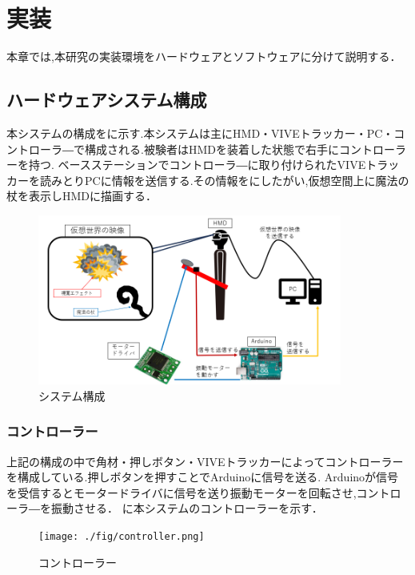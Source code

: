 \chapter{実装}
本章では,本研究の実装環境をハードウェアとソフトウェアに分けて説明する．

\section{ハードウェアシステム構成}
本システムの構成をに示す.本システムは主にHMD・VIVEトラッカー・PC・コントローラ―で構成される.被験者はHMDを装着した状態で右手にコントローラーを持つ.
ベースステーションでコントローラ―に取り付けられたVIVEトラッカーを読みとりPCに情報を送信する.その情報をにしたがい,仮想空間上に魔法の杖を表示しHMDに描画する．

\begin{figure}[h]
\centering
\includegraphics[clip,width=10cm]{fig/systemhard.png}
\caption{システム構成}\label{sys}
\end{figure}

\newpage

\subsection{コントローラー}
上記の構成の中で角材・押しボタン・VIVEトラッカーによってコントローラーを構成している.押しボタンを押すことでArduinoに信号を送る.
Arduinoが信号を受信するとモータードライバに信号を送り振動モーターを回転させ,コントローラ―を振動させる．
に本システムのコントローラーを示す．

\begin{figure}[h]
\centering
\texttt{[image: ./fig/controller.png]}
\caption{コントローラー}\label{controller}
\end{figure}






